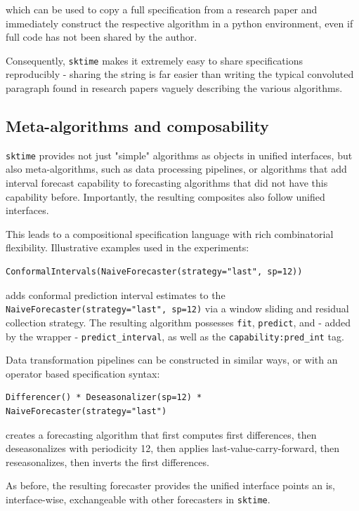 which can be used to copy a full specification from a research paper and immediately construct the respective algorithm in a python environment, even if full code has not been shared by the author.

Consequently, \texttt{sktime} makes it extremely easy to share specifications reproducibly - sharing the string is far easier than writing the typical convoluted paragraph found in research papers vaguely describing the various algorithms.


\subsection{Meta-algorithms and composability}

\texttt{sktime} provides not just "simple" algorithms as objects in unified interfaces, but also meta-algorithms, such as data processing pipelines, or algorithms that add interval forecast capability to forecasting algorithms that did not have this capability before. Importantly, the resulting composites also follow unified interfaces.

This leads to a compositional specification language with rich combinatorial flexibility.
Illustrative examples used in the experiments:

\begin{verbatim}
ConformalIntervals(NaiveForecaster(strategy="last", sp=12))
\end{verbatim}

adds conformal prediction interval estimates to the \texttt{NaiveForecaster(strategy="last", sp=12)} via a window sliding and residual collection strategy.
The resulting algorithm possesses \texttt{fit}, \texttt{predict}, and - added by the wrapper - \texttt{predict\_interval}, as well as the \texttt{capability:pred\_int} tag.

Data transformation pipelines can be constructed in similar ways, or with an operator based specification syntax:

\begin{verbatim}
Differencer() * Deseasonalizer(sp=12) * NaiveForecaster(strategy="last")
\end{verbatim}

creates a forecasting algorithm that first computes first differences, then deseasonalizes with periodicity 12, then applies last-value-carry-forward, then reseasonalizes, then inverts the first differences.

As before, the resulting forecaster provides the unified interface points an is, interface-wise, exchangeable with other forecasters in \texttt{sktime}.

